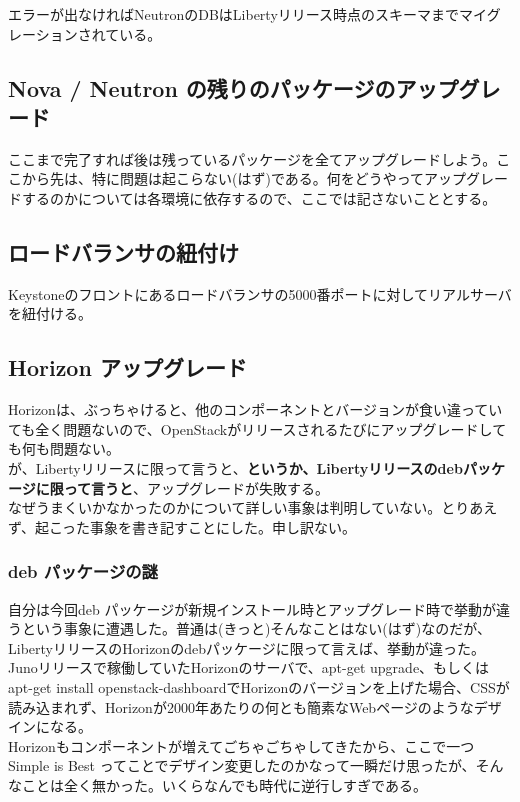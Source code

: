 \documentclass[9pt,b5paper,tombo,openany]{jsbook}
\begin{document}
\noindent
エラーが出なければNeutronのDBはLibertyリリース時点のスキーマまでマイグレーションされている。

\subsection{Nova / Neutron の残りのパッケージのアップグレード}
ここまで完了すれば後は残っているパッケージを全てアップグレードしよう。ここから先は、特に問題は起こらない(はず)である。何をどうやってアップグレードするのかについては各環境に依存するので、ここでは記さないこととする。

\subsection{ロードバランサの紐付け}
Keystoneのフロントにあるロードバランサの5000番ポートに対してリアルサーバを紐付ける。

\subsection{Horizon アップグレード}
Horizonは、ぶっちゃけると、他のコンポーネントとバージョンが食い違っていても全く問題ないので、OpenStackがリリースされるたびにアップグレードしても何も問題ない。\\[1ex]

が、Libertyリリースに限って言うと、\textbf{というか、Libertyリリースのdebパッケージに限って言うと}、アップグレードが失敗する。\\[1ex]

なぜうまくいかなかったのかについて詳しい事象は判明していない。とりあえず、起こった事象を書き記すことにした。申し訳ない。

\subsubsection{deb パッケージの謎}
自分は今回deb パッケージが新規インストール時とアップグレード時で挙動が違うという事象に遭遇した。普通は(きっと)そんなことはない(はず)なのだが、LibertyリリースのHorizonのdebパッケージに限って言えば、挙動が違った。\\[1ex]

Junoリリースで稼働していたHorizonのサーバで、apt-get upgrade、もしくはapt-get install openstack-dashboardでHorizonのバージョンを上げた場合、CSSが読み込まれず、Horizonが2000年あたりの何とも簡素なWebページのようなデザインになる。\\[1ex]

Horizonもコンポーネントが増えてごちゃごちゃしてきたから、ここで一つ Simple is Best ってことでデザイン変更したのかなって一瞬だけ思ったが、そんなことは全く無かった。いくらなんでも時代に逆行しすぎである。\\[1ex]
\end{document}
